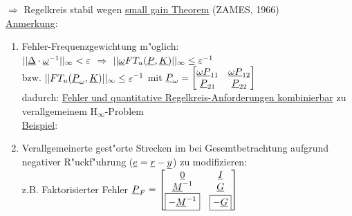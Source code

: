 \documentclass[openany,a4paper,11pt]{book}
\begin{document}
$\Rightarrow$ Regelkreis stabil wegen \uline{small gain Theorem}  (ZAMES, 1966)\\
\uline{Anmerkung}:\begin{enumerate}
    \item Fehler-Frequenzgewichtung m"oglich:\\
    $||\uline{\Delta}\cdot\uline{\omega}^{-1}||_\infty<\varepsilon$ $\Rightarrow$ $||\uline{\omega} FT_u(\uline{P},\uline{K})||_\infty\leq\varepsilon^{-1}$\\
    bzw. $|| FT_u(\uline{P}_\omega,\uline{K})||_\infty\leq\varepsilon^{-1}$ mit $\uline{P}_\omega=\begin{bmatrix} \uline{\omega P}_{11}&\uline{\omega P}_{12}\\\uline{P}_{21}&\uline{P}_{22}\end{bmatrix}$\\
    dadurch: \uline{Fehler und quantitative Regelkreis-Anforderungen kombinierbar} zu verallgemeinem H$_\infty$-Problem\\
    \uline{Beispiel}: 
    \item Verallgemeinerte gest"orte Strecken im  bei Gesemtbetrachtung aufgrund negativer R"uckf"uhrung ($\uline{e}=\uline{r}-\uline{y}$) zu modifizieren:\\
    z.B. Faktorisierter Fehler $\uline{P}_F=\begin{bmatrix}\uline{0}&\uline{I}\\\uline{M}^{-1}&\uline{G}\\ \boxed{-\uline{M}^{-1}}&\boxed{-\uline{G}}\end{bmatrix}$
\end{enumerate}
\end{document}

